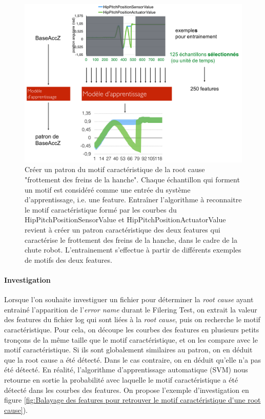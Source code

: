 \begin{figure}[h]
	\centering\includegraphics[width=14cm]{images/patron_motif.png}
	\caption[Créer un patron du motif caractéristique de la root cause "frottement des freins de la hanche"]{Créer un patron du motif caractéristique de la root cause "frottement des freins de la hanche". Chaque échantillon qui forment un motif est considéré comme une entrée du système d'apprentissage, i.e. une feature. Entraîner l'algorithme à reconnaitre le motif caractéristique formé par les courbes du HipPitchPositionSensorValue et HipPitchPositionActuatorValue revient à créer un patron caractéristique des deux features qui caractérise le frottement des freins de la hanche, dans le cadre de la chute robot. L'entrainement s'effectue à partir de différents exemples de motifs des deux features.}
	\label{fig:Créer un patron du motif caractéristique de la root cause "frottement des freins de la hanche"}
\end{figure}

\paragraph{Investigation}
Lorsque l'on souhaite investiguer un fichier pour déterminer la \emph{root cause} ayant entrainé l'apparition de l'\emph{error name} durant le Filering Test, on extrait la valeur des features du fichier log qui sont liées à la \emph{root cause}, puis on recherche le motif caractéristique. Pour cela, on découpe les courbes des features en plusieurs petits tronçons de la même taille que le motif caractéristique, et on les compare avec le motif caractéristique. Si ils sont globalement similaires au patron, on en déduit que la root cause a été détecté. Dans le cas contraire, on en déduit qu'elle n'a pas été détecté. En réalité, l'algorithme d'apprentissage automatique (SVM) nous retourne en sortie la probabilité avec laquelle le motif caractéristique a été détecté dans les courbes des features. On propose l'exemple d'investigation en figure \ref{fig:Balayage des features pour retrouver le motif caractéristique d'une root cause}).


